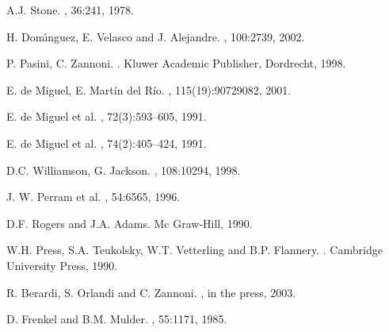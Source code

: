 \documentclass[%
reprint,
superscriptaddress,
showpacs,
 amsmath,amssymb,
 aps,
floatfix,
]{revtex4-1}
\begin{document}
\begin{thebibliography}{10}
{A.J. Stone}.
, 36:241, 1978.

{H. Dom\'{\i}nguez, E. Velasco and J. Alejandre}.
, 100:2739, 2002.

{P. Pasini, C. Zannoni}.
.
\newblock Kluwer Academic Publisher, Dordrecht, 1998.

{E. de Miguel, E. Mart\'{i}n del R\'{i}o}.
, 115(19):90729082, 2001.

{E. de Miguel et al}.
, 72(3):593--605, 1991.

{E. de Miguel et al}.
, 74(2):405--424, 1991.

{D.C. Williamson, G. Jackson}.
, 108:10294, 1998.

{J. W. Perram et al.}
, 54:6565, 1996.

{D.F. Rogers and J.A. Adams}.
\newblock Mc Graw-Hill, 1990.

{W.H. Press, S.A. Teukolsky, W.T. Vetterling and B.P. Flannery}.
.
\newblock Cambridge University Press, 1990.

{R. Berardi, S. Orlandi and C. Zannoni}.
, in the press, 2003.

{D. Frenkel and B.M. Mulder}.
, 55:1171, 1985.

\end{thebibliography}
\end{document}
